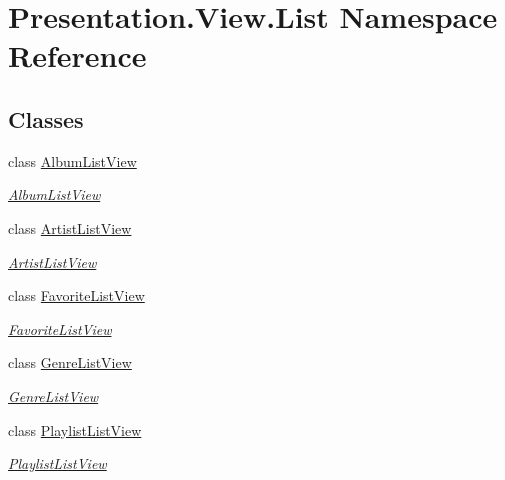 \hypertarget{namespace_presentation_1_1_view_1_1_list}{}\section{Presentation.\+View.\+List Namespace Reference}
\label{namespace_presentation_1_1_view_1_1_list}
\subsection*{Classes}
\begin{DoxyCompactItemize}
\item 
class \hyperlink{class_presentation_1_1_view_1_1_list_1_1_album_list_view}{Album\+List\+View}
\begin{DoxyCompactList}\small\item\em \hyperlink{class_presentation_1_1_view_1_1_list_1_1_album_list_view}{Album\+List\+View} \end{DoxyCompactList}\item 
class \hyperlink{class_presentation_1_1_view_1_1_list_1_1_artist_list_view}{Artist\+List\+View}
\begin{DoxyCompactList}\small\item\em \hyperlink{class_presentation_1_1_view_1_1_list_1_1_artist_list_view}{Artist\+List\+View} \end{DoxyCompactList}\item 
class \hyperlink{class_presentation_1_1_view_1_1_list_1_1_favorite_list_view}{Favorite\+List\+View}
\begin{DoxyCompactList}\small\item\em \hyperlink{class_presentation_1_1_view_1_1_list_1_1_favorite_list_view}{Favorite\+List\+View} \end{DoxyCompactList}\item 
class \hyperlink{class_presentation_1_1_view_1_1_list_1_1_genre_list_view}{Genre\+List\+View}
\begin{DoxyCompactList}\small\item\em \hyperlink{class_presentation_1_1_view_1_1_list_1_1_genre_list_view}{Genre\+List\+View} \end{DoxyCompactList}\item 
class \hyperlink{class_presentation_1_1_view_1_1_list_1_1_playlist_list_view}{Playlist\+List\+View}
\begin{DoxyCompactList}\small\item\em \hyperlink{class_presentation_1_1_view_1_1_list_1_1_playlist_list_view}{Playlist\+List\+View} \end{DoxyCompactList}\item 

\end{DoxyCompactItemize}
